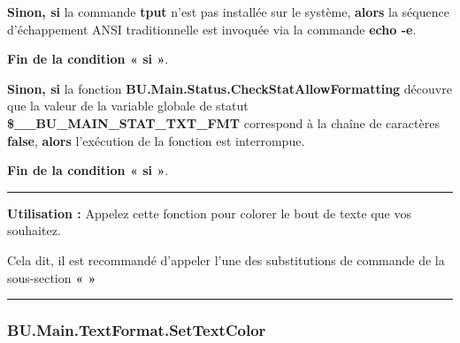 \documentclass[a4paper,10pt]{article}
\begin{document}
\begin{itemize}
{            \begin{justify}
                \textbf{\color{cond}Sinon, si} la commande \textbf{\color{cmds}tput} n'est pas installée sur le système, \textbf{\color{cond}alors} la séquence d'échappement ANSI traditionnelle est invoquée via la commande \textbf{\color{cmds}echo -e}.
            \end{justify}

            \begin{justify}
                \textbf{\color{cond}Fin de la condition « si »}.
            \end{justify}
        }
    \end{itemize}

    \begin{justify}
        \textbf{\color{cond}Sinon, si} la fonction \textbf{\color{func}BU.Main.Status.CheckStatAllowFormatting} découvre que la valeur de la variable globale de statut \textbf{\color{vars}\$\_\_BU\_MAIN\_STAT\_TXT\_FMT} correspond à la chaîne de caractères \textbf{false}, \textbf{\color{cond}alors} l'exécution de la fonction est interrompue.
    \end{justify}

    \begin{justify}
        \textbf{\color{cond}Fin de la condition « si »}.
    \end{justify}


    \par\noindent\rule{\textwidth}{0.4pt}

    \begin{justify}
        \textbf{Utilisation :} Appelez cette fonction pour colorer le bout de texte que vos souhaitez.
    \end{justify}

    \begin{justify}
        Cela dit, il est recommandé d'appeler l'une des substitutions de commande de la sous-section \textbf{\color{sec2}«  »}
    \end{justify}






    \color{sec3}\par\noindent\rule{\textwidth}{0.4pt}\color{text}

    \color{sec3}
    \subsubsection{BU.Main.TextFormat.SetTextColor}\color{text}
\end{document}
